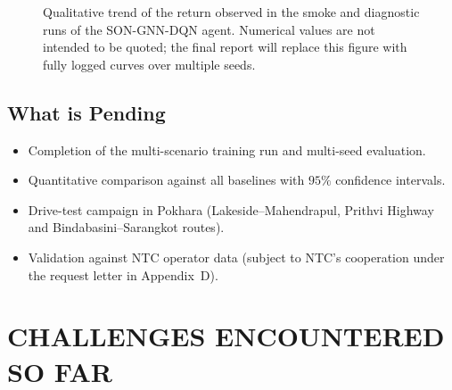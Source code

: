 \documentclass[12pt,a4paper,oneside]{report}
\begin{document}
\begin{figure}[H]
\centering
{}
\caption{Qualitative trend of the return observed in the smoke and
diagnostic runs of the SON-GNN-DQN agent. Numerical values are not
intended to be quoted; the final report will replace this figure with
fully logged curves over multiple seeds.}
\label{fig:training_curve_qual}
\end{figure}

\section{What is Pending}

\begin{itemize}[leftmargin=*]
    \item Completion of the multi-scenario training run and multi-seed
    evaluation.
    \item Quantitative comparison against all baselines with $95\%$
    confidence intervals.
    \item Drive-test campaign in Pokhara (Lakeside--Mahendrapul,
    Prithvi Highway and Bindabasini--Sarangkot routes).
    \item Validation against NTC operator data (subject to NTC's
    cooperation under the request letter in Appendix~D).
\end{itemize}

\chapter{CHALLENGES ENCOUNTERED SO FAR}
\end{document}
